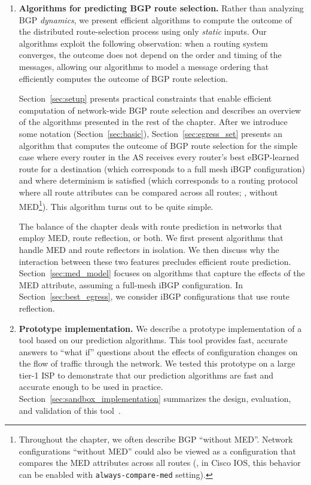 \begin{enumerate}
\itemsep=-1pt
\item \textbf{Algorithms for predicting BGP route selection.}
Rather than analyzing BGP {\em dynamics}, we present efficient
algorithms to compute the outcome of the distributed route-selection
process using only {\em static} inputs.  Our algorithms exploit the
following observation: when a routing system converges, the outcome does not
depend on the order and timing of the messages, allowing our algorithms
to model a message ordering that efficiently computes the outcome of BGP
route selection.

Section~\ref{sec:setup} presents practical constraints that enable
efficient computation of network-wide BGP route selection 
and describes an overview of the algorithms presented in the rest of the
chapter.  After we introduce some notation (Section~\ref{sec:basic}),
Section~\ref{sec:egress_set} presents an algorithm that computes the
outcome of BGP route selection for the simple case where every router in
the AS receives every router's best eBGP-learned route for a destination
(which corresponds to a full mesh iBGP configuration) and where
determinism is satisfied (which 
corresponds to a routing protocol where all route attributes can be
compared across all routes; \ie, without MED\footnote{Throughout the
chapter, we often describe BGP ``without MED''. Network configurations
``without MED'' could also be viewed as a configuration that compares
the MED attributes across all routes (\eg, in Cisco IOS, this behavior
can be enabled with {\tt always-compare-med} setting).}).  This
algorithm turns out to be quite simple.  

The balance of the chapter
deals with route prediction in networks that employ MED, route
reflection, or both.
We first present algorithms that handle MED
and route reflectors in isolation.  We then discuss why the interaction
between these two features precludes efficient route prediction.
Section~\ref{sec:med_model} focuses on algorithms that capture the
effects of the MED attribute, assuming a full-mesh iBGP configuration.
In Section~\ref{sec:best_egress}, we consider iBGP configurations that
use route reflection.

\item {\bf Prototype implementation.}
We describe a prototype implementation of a tool based on our prediction
algorithms.  This tool provides fast, accurate answers to ``what if''
questions about the effects of configuration changes on the flow of
traffic through the network.  We tested this prototype on a large tier-1
ISP to demonstrate that our prediction algorithms are fast and accurate
enough to be used in practice.  Section~\ref{sec:sandbox_implementation}
summarizes the design, evaluation, and validation of this
tool~\cite{Feamster2004}.


\end{enumerate}

